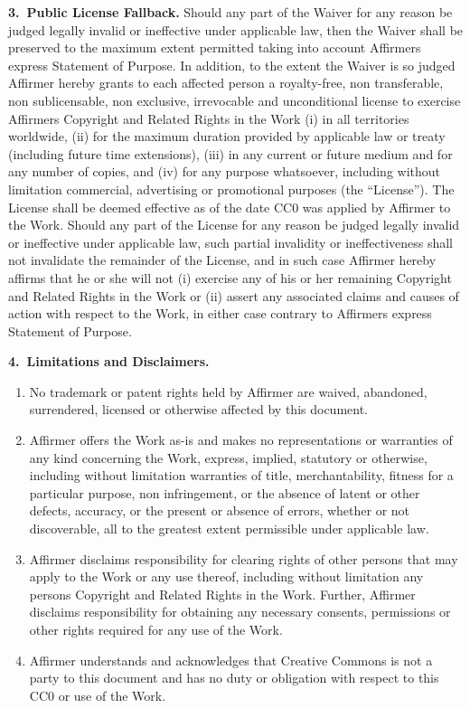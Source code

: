 \textbf{3.~Public License Fallback.}
Should any part of the Waiver for any reason be judged legally
invalid or ineffective under applicable law, then the Waiver shall
be preserved to the maximum extent permitted taking into account
Affirmer\textquotesingle{}s express Statement of Purpose. In
addition, to the extent the Waiver is so judged Affirmer hereby
grants to each affected person a royalty-free, non transferable,
non sublicensable, non exclusive, irrevocable and unconditional
license to exercise Affirmer\textquotesingle{}s Copyright and
Related Rights in the Work (i) in all territories worldwide, (ii)
for the maximum duration provided by applicable law or treaty
(including future time extensions), (iii) in any current or future
medium and for any number of copies, and (iv) for any purpose
whatsoever, including without limitation commercial, advertising
or promotional purposes (the ``License''). The License shall be
deemed effective as of the date CC0 was applied by Affirmer to the
Work. Should any part of the License for any reason be judged
legally invalid or ineffective under applicable law, such partial
invalidity or ineffectiveness shall not invalidate the remainder
of the License, and in such case Affirmer hereby affirms that he
or she will not (i) exercise any of his or her remaining Copyright
and Related Rights in the Work or (ii) assert any associated
claims and causes of action with respect to the Work, in either
case contrary to Affirmer\textquotesingle{}s express Statement of
Purpose.

\textbf{4.~Limitations and Disclaimers.}
\begin{enumerate}[label={\alph*}.,ref={\alph*}]
    \item No trademark or patent rights held by Affirmer are
          waived, abandoned, surrendered, licensed or otherwise
          affected by this document.
    \item Affirmer offers the Work as-is and makes no
          representations or warranties of any kind concerning
          the Work, express, implied, statutory or otherwise,
          including without limitation warranties of title,
          merchantability, fitness for a particular purpose, non
          infringement, or the absence of latent or other defects,
          accuracy, or the present or absence of errors, whether
          or not discoverable, all to the greatest extent
          permissible under applicable law.
    \item Affirmer disclaims responsibility for clearing rights of
          other persons that may apply to the Work or any use
          thereof, including without limitation any
          person\textquotesingle{}s Copyright and Related Rights
          in the Work. Further, Affirmer disclaims responsibility
          for obtaining any necessary consents, permissions or
          other rights required for any use of the Work.
    \item Affirmer understands and acknowledges that Creative
          Commons is not a party to this document and has no duty
          or obligation with respect to this CC0 or use of the
          Work.
\end{enumerate}
